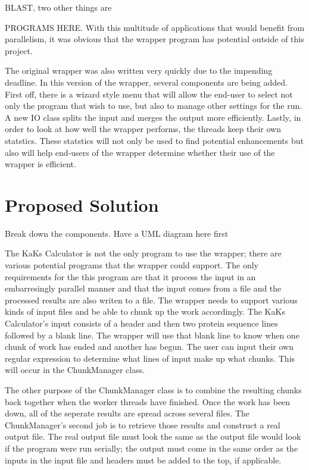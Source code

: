 \documentclass[12pt]{article}
\begin{document}
BLAST, two other things are

PROGRAMS HERE. With this multitude of applications that would benefit from
parallelism, it was obvious that the wrapper program has potential outside of
this project.


The original wrapper was also written very quickly due to the impending
deadline. In this version of the wrapper, several components are being added.
First off, there is a wizard style menu that will allow the end-user to select
not only the program that wish to use, but also to manage other settings for the
run. A new IO class splits the input and merges the output more 
efficiently. Lastly, in order to look at how well the wrapper performs, 
the threads keep their own statstics. These statstics will not only be used to 
find potential enhancements but also will help end-users of the wrapper
determine whether their use of the wrapper is efficient.

\section{Proposed Solution}

Break down the components. Have a UML diagram here first

The KaKs Calculator is not the only program to use the wrapper; there are
various potential programs that the wrapper could support. The only requirements
for the this program are that it process the input in an embarresingly parallel
manner and that the input comes from a file and the processed results are also
writen to a file. The wrapper needs to support various kinds of input files and 
be able to chunk up the work accordingly. The KaKs Calculator's input consists 
of a header and then two protein sequence lines followed by a blank line. The 
wrapper will use that blank line to know when one chunk of work has ended and 
another has begun. The user can input their own regular expression to determine 
what lines of input make up what chunks. This will occur in the ChunkManager 
class. 

The other purpose of the ChunkManager class is to combine the resulting chunks 
back together when the worker threads have finished. Once the work has been
down, all of the seperate results are spread across several files. The
ChunkManager's second job is to retrieve those results and construct a real
output file. The real output file must look the same as the output file would
look if the program were run serially; the output must come in the same order as
the inputs in the input file and headers must be added to the top, if
applicable.
\end{document}
